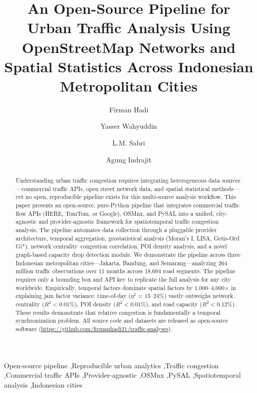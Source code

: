 \documentclass[preprint,12pt,authoryear]{elsarticle}
\begin{document}
\begin{frontmatter}

\title{An Open-Source Pipeline for Urban Traffic Analysis Using OpenStreetMap Networks and Spatial Statistics Across Indonesian Metropolitan Cities}

\author[undip]{Firman Hadi}
\author[undip]{Yasser Wahyuddin}
\author[undip]{L.M. Sabri}
\author[ikn]{Agung Indrajit}


\begin{abstract}
Understanding urban traffic congestion requires integrating heterogeneous data sources---commercial traffic APIs, open street network data, and spatial statistical methods---yet no open, reproducible pipeline exists for this multi-source analysis workflow. This paper presents an open-source, pure-Python pipeline that integrates commercial traffic flow APIs (HERE, TomTom, or Google), OSMnx, and PySAL into a unified, city-agnostic and provider-agnostic framework for spatiotemporal traffic congestion analysis. The pipeline automates data collection through a pluggable provider architecture, temporal aggregation, geostatistical analysis (Moran's I, LISA, Getis-Ord Gi*), network centrality--congestion correlation, POI density analysis, and a novel graph-based capacity drop detection module. We demonstrate the pipeline across three Indonesian metropolitan cities---Jakarta, Bandung, and Semarang---analyzing 264 million traffic observations over 11 months across 18,694 road segments. The pipeline requires only a bounding box and API key to replicate the full analysis for any city worldwide. Empirically, temporal factors dominate spatial factors by 1,000--4,000$\times$ in explaining jam factor variance: time-of-day ($\eta^2$ = 15--24\%) vastly outweighs network centrality ($R^2 < 0.01$\%), POI density ($R^2 < 0.01$\%), and road capacity ($R^2 < 0.12$\%). These results demonstrate that relative congestion is fundamentally a temporal synchronization problem. All source code and datasets are released as open-source software (\url{https://github.com/firmanhadi21/traffic-analyses}).
\end{abstract}

\begin{keyword}
Open-source pipeline \sep Reproducible urban analytics \sep Traffic congestion \sep Commercial traffic APIs \sep Provider-agnostic \sep OSMnx \sep PySAL \sep Spatiotemporal analysis \sep Indonesian cities
\end{keyword}

\end{frontmatter}
\end{document}
